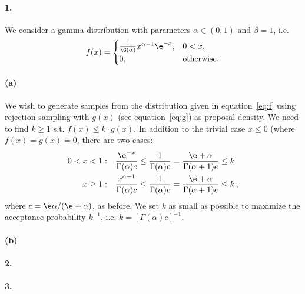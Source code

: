 \paragraph{1.}
We consider a gamma distribution with parameters $\alpha \in (0, 1)$ and $\beta = 1$, i.e.
%
\begin{equation}
\label{eq:f}
    f(x) = 
    \begin{cases}
    \frac{1}{\G(\alpha)} x^{\alpha-1} \e^{-x}, & 0 < x, \\
    0, & \text{otherwise}.
    \end{cases}
\end{equation}
%

\paragraph{(a)}
We wish to generate samples from the distribution given in equation~\eqref{eq:f} using rejection sampling with $g(x)$ (see equation~\eqref{eq:g}) as proposal density. We need to find $k \geq 1$ s.t. $f(x) \leq k \cdot g(x)$. In addition to the trivial case $x \leq 0$ (where $f(x) = g(x) = 0$, there are two cases:
%
\begin{align*}
    0 < x < 1: & \quad \frac{\e^{-x}}{\Gamma(\alpha)c} \leq \frac{1}{\Gamma(\alpha)c} = \frac{\e + \alpha}{\Gamma(\alpha + 1)e} \leq k \\
    x \geq 1: & \quad \frac{x^{\alpha - 1}}{\Gamma(\alpha)c} \leq \frac{1}{\Gamma(\alpha)c} = \frac{\e + \alpha}{\Gamma(\alpha + 1)e} \leq k \, ,
\end{align*}
%
where $c = \e\alpha/(\e + \alpha)$, as before. We set $k$ as small as possible to maximize the acceptance probability $k^{-1}$, i.e. $k = [\Gamma(\alpha)c]^{-1}$.

\paragraph{(b)}


\paragraph{2.}

\paragraph{3.}
